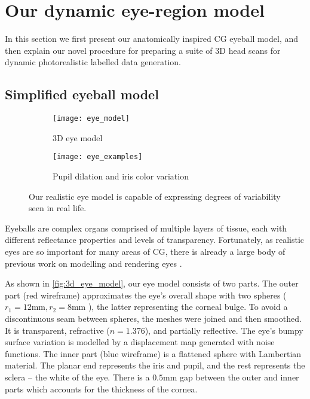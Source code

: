
\section{Our dynamic eye-region model}



In this section we first present our anatomically inspired CG eyeball model, and then explain our novel procedure for preparing a suite of 3D head scans for dynamic photorealistic labelled data generation.

\subsection{Simplified eyeball model}
\label{subsec:eyeball_model}

\begin{figure}
    \centering
    \begin{subfigure}[t]{0.33\columnwidth}
        \texttt{[image: eye\_model]}
        \caption{3D eye model}
        \label{fig:3d_eye_model}
    \end{subfigure}%
    \hfill
    \begin{subfigure}[t]{0.65\columnwidth}
        \texttt{[image: eye\_examples]}
        \caption{Pupil dilation and iris color variation}
    \end{subfigure}
    \caption{Our realistic eye model is capable of expressing degrees of variability seen in real life.}
    \label{fig:eye_model}
\end{figure}

Eyeballs are complex organs comprised of multiple layers of tissue, each with different reflectance properties and levels of transparency. Fortunately, as realistic eyes are so important for many areas of CG, there is already a large body of previous work on modelling and rendering eyes \cite{ruhland2014look}.


As shown in \autoref{fig:3d_eye_model}, our eye model consists of two parts.
%
The outer part (red wireframe) approximates the eye's overall shape with two spheres ($r_1\!=\!12\textrm{mm}, r_2\!=\!8\textrm{mm}$ \cite{ruhland2014look}), the latter representing the corneal bulge. To avoid a discontinuous seam between spheres, the meshes were joined and then smoothed. It is transparent, refractive ($n\!=\!1.376$), and partially reflective. The eye's bumpy surface variation is modelled by a displacement map generated with noise functions.
%
The inner part (blue wireframe) is a flattened sphere with Lambertian material. The planar end represents the iris and pupil, and the rest represents the sclera -- the white of the eye.
%
There is a $0.5\textrm{mm}$ gap between the outer and inner parts which accounts for the thickness of the cornea. 

